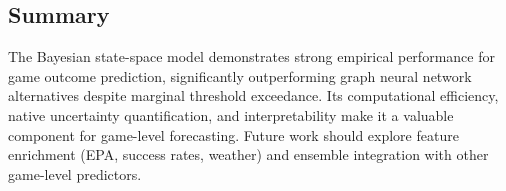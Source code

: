 \subsection{Summary}

The Bayesian state-space model demonstrates strong empirical performance for game outcome prediction, significantly outperforming graph neural network alternatives despite marginal threshold exceedance. Its computational efficiency, native uncertainty quantification, and interpretability make it a valuable component for game-level forecasting. Future work should explore feature enrichment (EPA, success rates, weather) and ensemble integration with other game-level predictors.
